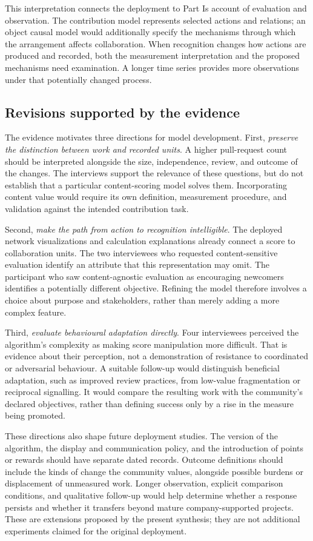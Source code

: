 This interpretation connects the deployment to Part I\textquotesingle s account of evaluation and observation. The contribution model represents selected actions and relations; an object causal model would additionally specify the mechanisms through which the arrangement affects collaboration. When recognition changes how actions are produced and recorded, both the measurement interpretation and the proposed mechanisms need examination. A longer time series provides more observations under that potentially changed process.

\subsection{Revisions supported by the evidence}
The evidence motivates three directions for model development. First, \emph{preserve the distinction between work and recorded units}. A higher pull-request count should be interpreted alongside the size, independence, review, and outcome of the changes. The interviews support the relevance of these questions, but do not establish that a particular content-scoring model solves them. Incorporating content value would require its own definition, measurement procedure, and validation against the intended contribution task.

Second, \emph{make the path from action to recognition intelligible}. The deployed network visualizations and calculation explanations already connect a score to collaboration units. The two interviewees who requested content-sensitive evaluation identify an attribute that this representation may omit. The participant who saw content-agnostic evaluation as encouraging newcomers identifies a potentially different objective. Refining the model therefore involves a choice about purpose and stakeholders, rather than merely adding a more complex feature.

Third, \emph{evaluate behavioural adaptation directly}. Four interviewees perceived the algorithm's complexity as making score manipulation more difficult. That is evidence about their perception, not a demonstration of resistance to coordinated or adversarial behaviour. A suitable follow-up would distinguish beneficial adaptation, such as improved review practices, from low-value fragmentation or reciprocal signalling. It would compare the resulting work with the community's declared objectives, rather than defining success only by a rise in the measure being promoted.

These directions also shape future deployment studies. The version of the algorithm, the display and communication policy, and the introduction of points or rewards should have separate dated records. Outcome definitions should include the kinds of change the community values, alongside possible burdens or displacement of unmeasured work. Longer observation, explicit comparison conditions, and qualitative follow-up would help determine whether a response persists and whether it transfers beyond mature company-supported projects. These are extensions proposed by the present synthesis; they are not additional experiments claimed for the original deployment.

